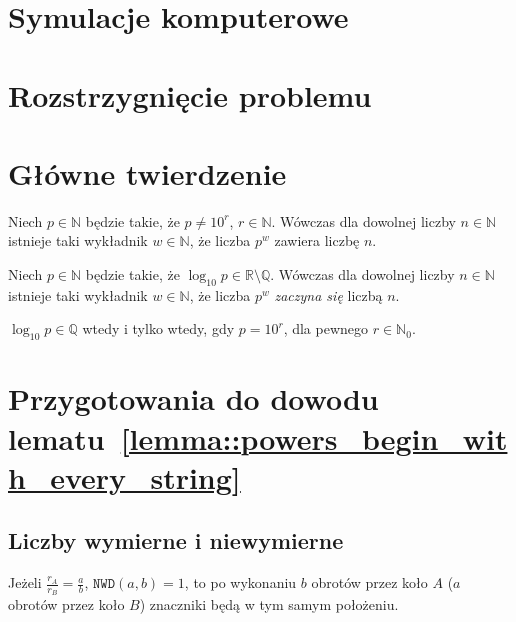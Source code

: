 \documentclass[aspectratio=169]{beamer}
\newcommand{\R}{\mathbb{R}}
\newcommand{\Q}{\mathbb{Q}}
\newcommand{\N}{\mathbb{N}}
\renewcommand{\gcd}[2]{\mathtt{NWD}\paren{#1, #2}}
\newcommand{\labelOnSlide}[2]{\label<#1>{#2}}
\newcommand{\define}[1]{\textcolor{colorOfDefinition}{\textit{#1}}}
\newcommand{\paren}[1]{\!\left(#1 \right)}
\newcommand{\goToProof}[1]{\hfill\hyperlink{#1}{\normalfont\faArrowCircleRight}}
\begin{document}
\section{Symulacje komputerowe}

{\expSubstrPlotsTex}

\section{Rozstrzygnięcie problemu}
\section{Główne twierdzenie}

\begin{frame}
  \pause{}
  \begin{theorem}
    Niech $p \in \N$ będzie takie, że $p \not = 10^r$, $r \in \N$.
    Wówczas dla dowolnej liczby $n \in \N$ istnieje taki wykładnik $w \in \N$, że liczba $p^w$ zawiera liczbę $n$.
  \end{theorem}
  \pause{}
  \begin{lemma}
    \labelOnSlide{4}{lemma::powers_begin_with_every_string}
    Niech $p \in \N$ będzie takie, że $\log_{10}p \in \R \setminus \Q$.
    Wówczas dla dowolnej liczby $n \in \N$ istnieje taki wykładnik $w \in \N$, że liczba $p^w$ \define{zaczyna się} liczbą $n$. \goToProof{proof::lemma::powers_begin_with_every_string}
  \end{lemma}
  \pause{}
  \begin{lemma}
    \labelOnSlide{4}{lemma::log_10_rational_iff}
    $\log_{10}p \in \Q$ wtedy i tylko wtedy, gdy $p = 10^r$, dla pewnego $r \in \N_0$.
    \goToProof{proof::lemma::log_10_rational_iff}
  \end{lemma}
\end{frame}

\section{\texorpdfstring{Przygotowania do dowodu lematu~\protect\ref{lemma::powers_begin_with_every_string}}{Przygotowania do dowodu głównego lematu}}
\subsection{Liczby wymierne i niewymierne}

\begin{frame}
  \begin{figure}
    {\wheelsRationalTex}
  \end{figure}
  \begin{theorem}
  Jeżeli $\frac{r_A}{r_B} = \frac{a}{b}$, $\gcd{a}{b} = 1$, to po wykonaniu $b$ obrotów przez koło $A$ ($a$ obrotów przez koło $B$)
  \textcolor{\wheelMarkerColor}{znaczniki} będą w tym samym położeniu.
  \end{theorem}
\end{frame}
\end{document}
